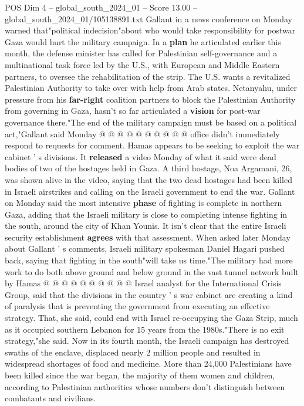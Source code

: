 \begin{textsample}{POS Dim 4 – global\_south\_2024\_01 – Score 13.00 – global\_south\_2024\_01/105138891.txt}
Gallant in a news conference on Monday warned that"political indecision"about who would take responsibility for postwar Gaza would hurt the military campaign.
In a \textbf{plan} he articulated earlier this month, the defense minister has called for Palestinian self-governance and a multinational task force led by the U.S., with European and Middle Eastern partners, to oversee the rehabilitation of the strip.
The U.S. wants a revitalized Palestinian Authority to take over with help from Arab states.
Netanyahu, under pressure from his \textbf{far-right} coalition partners to block the Palestinian Authority from governing in Gaza, hasn't so far articulated a \textbf{vision} for post-war governance there."The end of the military campaign must be based on a political act,"Gallant said Monday @ @ @ @ @ @ @ @ @ @ office didn't immediately respond to requests for comment.
Hamas appears to be seeking to exploit the war cabinet ' s divisions.
It \textbf{released} a video Monday of what it said were dead bodies of two of the hostages held in Gaza.
A third hostage, Noa Argamani, 26, was shown alive in the video, saying that the two dead hostages had been killed in Israeli airstrikes and calling on the Israeli government to end the war.
Gallant on Monday said the most intensive \textbf{phase} of fighting is complete in northern Gaza, adding that the Israeli military is close to completing intense fighting in the south, around the city of Khan Younis.
It isn't clear that the entire Israeli security establishment \textbf{agrees} with that assessment.
When asked later Monday about Gallant ' s comments, Israeli military spokesman Daniel Hagari pushed back, saying that fighting in the south"will take us time."The military had more work to do both above ground and below ground in the vast tunnel network built by Hamas @ @ @ @ @ @ @ @ @ @ Israel analyst for the International Crisis Group, said that the divisions in the country ' s war cabinet are creating a kind of paralysis that is preventing the government from executing an effective strategy.
That, she said, could end with Israel re-occupying the Gaza Strip, much as it occupied southern Lebanon for 15 years from the 1980s."There is no exit strategy,"she said.
Now in its fourth month, the Israeli campaign has destroyed swaths of the enclave, displaced nearly 2 million people and resulted in widespread shortages of food and medicine.
More than 24,000 Palestinians have been killed since the war began, the majority of them women and children, according to Palestinian authorities whose numbers don't distinguish between combatants and civilians.

\end{textsample}
